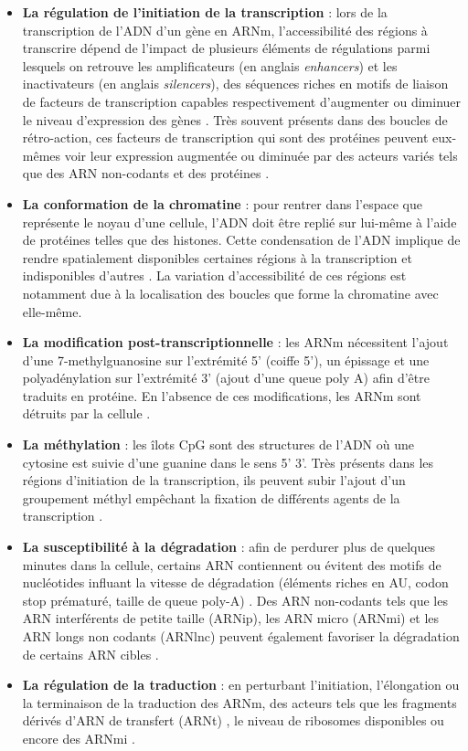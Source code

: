 \begin{itemize}
    \item \textbf{La régulation de l'initiation de la transcription} : lors de la transcription de l'ADN d'un gène en ARNm, l'accessibilité des régions à transcrire dépend de l'impact de plusieurs éléments de régulations parmi lesquels on retrouve les amplificateurs (en anglais \textit{enhancers}) et les inactivateurs (en anglais \textit{silencers}), des séquences riches en motifs de liaison de facteurs de transcription capables respectivement d'augmenter ou diminuer le niveau d'expression des gènes \cite{Levo2014Jul}. Très souvent présents dans des boucles de rétro-action, ces facteurs de transcription qui sont des protéines peuvent eux-mêmes voir leur expression augmentée ou diminuée par des acteurs variés tels que des ARN non-codants et des protéines \cite{Chen2020May}.
    \item \textbf{La conformation de la chromatine} : pour rentrer dans l'espace que représente le noyau d'une cellule, l'ADN doit être replié sur lui-même à l'aide de protéines telles que des histones. Cette condensation de l'ADN implique de rendre spatialement disponibles certaines régions à la transcription et indisponibles d'autres \cite{Kadauke2009Jan}.
    La variation d'accessibilité de ces régions est notamment due à la localisation des boucles que forme la chromatine avec elle-même.
    \item \textbf{La modification post-transcriptionnelle} : les ARNm nécessitent l'ajout d'une 7-methylguanosine sur l'extrémité 5' (coiffe 5'), un épissage et une polyadénylation sur l'extrémité 3' (ajout d'une queue poly A) afin d'être traduits en protéine. En l'absence de ces modifications, les ARNm sont détruits par la cellule \cite{Mercer2010Nov}.
    \item \textbf{La méthylation} : les îlots CpG sont des structures de l'ADN où une cytosine est suivie d'une guanine dans le sens 5' \textrightarrow{} 3'. Très présents dans les régions d'initiation de la transcription, ils peuvent subir l'ajout d'un groupement méthyl empêchant la fixation de différents agents de la transcription \cite{Gutierrez-Arcelus2013Jun}.
    \item \textbf{La susceptibilité à la dégradation} : afin de perdurer plus de quelques minutes dans la cellule, certains ARN contiennent ou évitent des motifs de nucléotides influant la vitesse de dégradation (éléments riches en AU, codon stop prématuré, taille de queue poly-A) \cite{Yu2001}. Des ARN non-codants tels que les ARN interférents de petite taille (ARNip), les ARN micro (ARNmi) et les ARN longs non codants (ARNlnc) peuvent également favoriser la dégradation de certains ARN cibles \cite{Patil2014Jan}.
    \item \textbf{La régulation de la traduction} : en perturbant l'initiation, l'élongation ou la terminaison de la traduction des ARNm, des acteurs tels que les fragments dérivés d'ARN de transfert (ARNt) \cite{Krishna2021Mar}, le niveau de ribosomes disponibles \cite{Khajuria2018Mar} ou encore des ARNmi \cite{Meijer2013Apr}.
\end{itemize}


